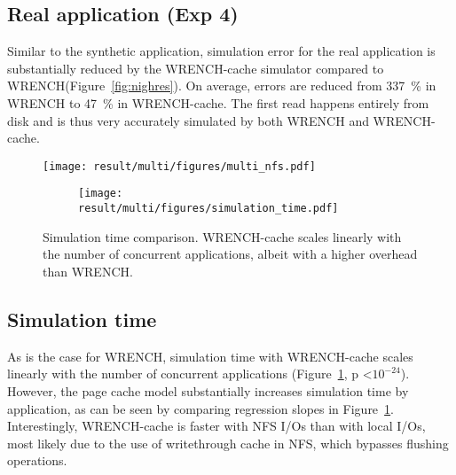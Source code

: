 \documentclass[conference]{IEEEtran}
\newcommand{\wrench}{WRENCH\xspace}
\begin{document}
        \subsection{Real application (Exp 4)}

        Similar to the synthetic application, simulation error for the real application is
        substantially reduced by the \wrench-cache simulator compared to
        \wrench (Figure~\ref{fig:nighres}). On average, errors are reduced
        from 337~\% in \wrench to 47~\% in \wrench-cache. 
        The first read happens entirely from disk and is thus 
        very accurately simulated by both \wrench and \wrench-cache.

            \begin{figure*}
                \begin{subfigure}{\linewidth}
                    \centering
                    \texttt{[image: result/multi/figures/multi\_nfs.pdf]}
                \end{subfigure}
                \caption{NFS results with 3~GB files (\textit{Exp 3})}
                \label{fig:multi_nfs}
                \end{figure*}
    
            \begin{figure}
                \begin{subfigure}{\columnwidth}
                    \centering
                    \texttt{[image: result/multi/figures/simulation\_time.pdf]}
                \end{subfigure}
                \caption{Simulation time comparison. \wrench-cache scales
                linearly with the number of concurrent applications, albeit
                with a higher overhead than \wrench.}
                \label{fig:multi_time}
                \end{figure}
    
        \subsection{Simulation time}

        As is the case for \wrench, simulation time with \wrench-cache scales
        linearly with the number of concurrent applications
        (Figure~\ref{fig:multi_time}, p \textless $10^{-24}$). However, the page
        cache model substantially increases simulation time by
        application, as can be seen by comparing regression slopes in
        Figure~\ref{fig:multi_time}. Interestingly, \wrench-cache is faster with 
        NFS I/Os than with local I/Os, most likely due to the use of writethrough
        cache in NFS, which bypasses flushing operations.
\end{document}
